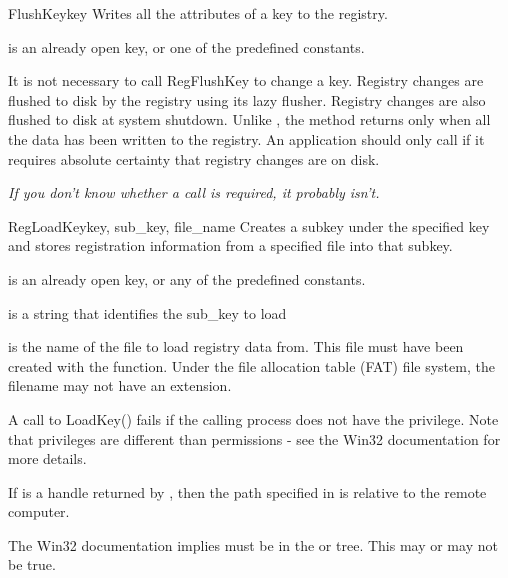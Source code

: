 \begin{funcdesc}{FlushKey}{key}
  Writes all the attributes of a key to the registry.

  is an already open key, or one of the predefined 
  constants.

 It is not necessary to call RegFlushKey to change a key.
 Registry changes are flushed to disk by the registry using its lazy 
 flusher.  Registry changes are also flushed to disk at system 
 shutdown.  Unlike , the  method 
 returns only when all the data has been written to the registry.
 An application should only call  if it requires absolute 
 certainty that registry changes are on disk.
 
 \emph{If you don't know whether a  call is required, it 
 probably isn't.}
 
\end{funcdesc}


\begin{funcdesc}{RegLoadKey}{key, sub_key, file_name}
 Creates a subkey under the specified key and stores registration 
 information from a specified file into that subkey.

  is an already open key, or any of the predefined
  constants.
 
  is a string that identifies the sub_key to load
 
  is the name of the file to load registry data from.
  This file must have been created with the  function.
  Under the file allocation table (FAT) file system, the filename may not
  have an extension.

 A call to LoadKey() fails if the calling process does not have the
  privilege. Note that privileges
 are different than permissions - see the Win32 documentation for
 more details.

 If  is a handle returned by , 
 then the path specified in  is relative to the 
 remote computer.

 The Win32 documentation implies  must be in the 
  or  tree.
 This may or may not be true.
\end{funcdesc}


